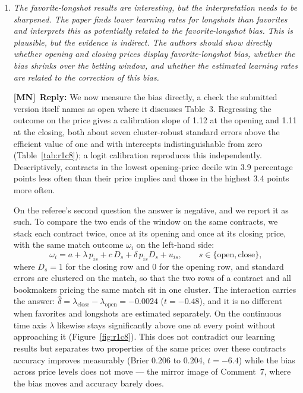 \documentclass[letterpaper,12pt]{article}
\newcounter{b}
\newcommand{\ReplyMN}[1]{\par\noindent%
  \textcolor{mncol}{\textbf{[MN]}}~\textbf{Reply:} #1}
\begin{document}
\begin{enumerate}
\item \textit{The favorite-longshot results are interesting, but the interpretation needs to be sharpened. The paper finds lower learning rates for longshots than favorites and interprets
this as potentially related to the favorite-longshot bias. This is plausible, but the evidence is indirect. The authors should show directly whether opening and closing
prices display favorite-longshot bias, whether the bias shrinks over the betting window, and whether the estimated learning rates are related to the correction of this
bias. }

\ReplyMN{We now measure the bias directly, a check the submitted version itself names as open where it discusses Table~3. Regressing the outcome on the price gives a calibration slope of 1.12 at the opening and 1.11 at the closing, both about seven cluster-robust standard errors above the efficient value of one and with intercepts indistinguishable from zero (Table~\ref{tab:r1c8}); a logit calibration reproduces this independently. Descriptively, contracts in the lowest opening-price decile win 3.9 percentage points less often than their price implies and those in the highest 3.4 points more often.

On the referee's second question the answer is negative, and we report it as such. To compare the two ends of the window on the same contracts, we stack each contract twice, once at its opening and once at its closing price, with the same match outcome $\omega_i$ on the left-hand side:
\begin{equation*}
\omega_i = a + \lambda \, p_{is} + c \, D_s + \delta \, p_{is} D_s + u_{is},
\qquad s \in \{\text{open}, \text{close}\},
\end{equation*}
where $D_s = 1$ for the closing row and $0$ for the opening row, and standard errors are clustered on the match, so that the two rows of a contract and all bookmakers pricing the same match sit in one cluster. The interaction carries the answer: $\hat{\delta} = \lambda_{\text{close}} - \lambda_{\text{open}} = -0.0024$ ($t = -0.48$), and it is no different when favorites and longshots are estimated separately. On the continuous time axis $\lambda$ likewise stays significantly above one at every point without approaching it (Figure~\ref{fig:r1c8}). This does not contradict our learning results but separates two properties of the same price: over these contracts accuracy improves measurably (Brier 0.206 to 0.204, $t = -6.4$) while the bias across price levels does not move --- the mirror image of Comment~7, where the bias moves and accuracy barely does.

}
\end{enumerate}
\end{document}
